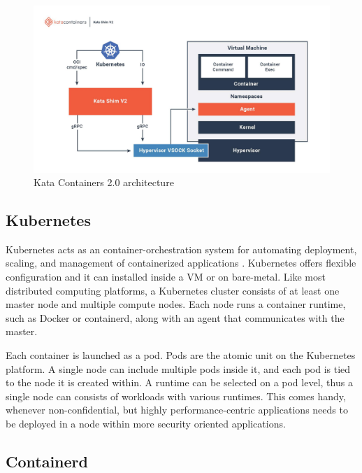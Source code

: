 \begin{figure}[ht]
  \begin{center}
    \includegraphics[width=15cm]{LaTeX/images/KataContainersArchitecture.jpg}
    \caption{Kata Containers 2.0 architecture \cite{KataContainers}}
    \label{fig:KataContainersArchitecture}
  \end{center}
\end{figure}

\subsection{Kubernetes}

Kubernetes acts as an container-orchestration system for automating deployment, scaling, and management of containerized applications \cite{Kubernetes}. Kubernetes offers flexible configuration and it can installed inside a VM or on bare-metal. Like most distributed computing platforms, a Kubernetes cluster consists of at least one master node and multiple compute nodes. Each node runs a container runtime, such as Docker or containerd, along with an agent that communicates with the master.

Each container is launched as a pod. Pods are the atomic unit on the Kubernetes platform. A single node can include multiple pods inside it, and each pod is tied to the node it is created within. A runtime can be selected on a pod level, thus a single node can consists of workloads with various runtimes. This comes handy, whenever non-confidential, but highly performance-centric applications needs to be deployed in a node within more security oriented applications.

\subsection{Containerd}

